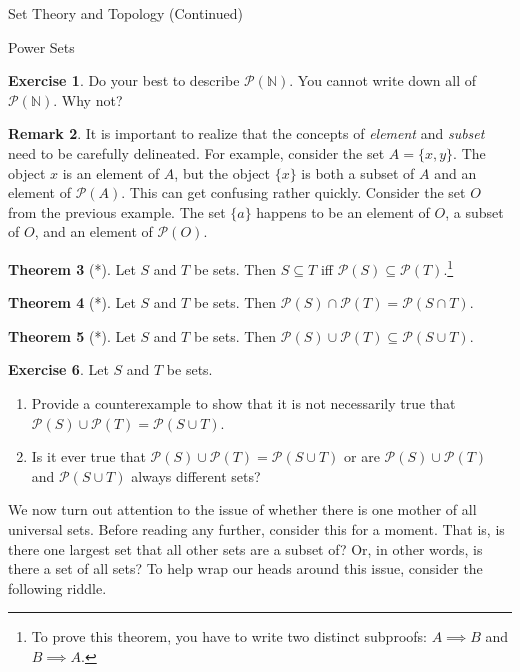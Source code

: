 \documentclass[11pt]{article}
\theoremstyle{definition}
\newtheorem{theorem}{Theorem}[section]
\newtheorem{exercise}[theorem]{Exercise}
\newtheorem{remark}[theorem]{Remark}
\begin{document}
\begin{section}{Set Theory and Topology (Continued)}
\begin{subsection}{Power Sets}
\begin{exercise}
Do your best to describe $\mathcal{P}(\mathbb{N})$.  You cannot write down all of $\mathcal{P}(\mathbb{N})$.  Why not?
\end{exercise}

\begin{remark}
It is important to realize that the concepts of \emph{element} and \emph{subset} need to be carefully delineated.  For example, consider the set $A=\{x,y\}$.  The object $x$ is an element of $A$, but the object $\{x\}$ is both a subset of $A$ and an element of $\mathcal{P}(A)$.  This can get confusing rather quickly.  Consider the set $O$ from the previous example.  The set $\{a\}$ happens to be an element of $O$, a subset of $O$, and an element of  $\mathcal{P}(O)$.
\end{remark}

\begin{theorem}[*]
Let $S$ and $T$ be sets.  Then $S\subseteq T$ iff $\mathcal{P}(S)\subseteq \mathcal{P}(T)$.\footnote{To prove this theorem, you have to write two distinct subproofs: $A\implies B$ and $B\implies A$.}
\end{theorem}

\begin{theorem}[*]
Let $S$ and $T$ be sets.  Then $\mathcal{P}(S)\cap\mathcal{P}(T)=\mathcal{P}(S\cap T)$.
\end{theorem}

\begin{theorem}[*]
Let $S$ and $T$ be sets.  Then $\mathcal{P}(S)\cup\mathcal{P}(T)\subseteq \mathcal{P}(S\cup T)$.
\end{theorem}


\begin{exercise}
Let $S$ and $T$ be sets.
\begin{enumerate}
\item Provide a counterexample to show that it is not necessarily true that $\mathcal{P}(S)\cup\mathcal{P}(T)= \mathcal{P}(S\cup T)$.
\item Is it ever true that $\mathcal{P}(S)\cup\mathcal{P}(T)= \mathcal{P}(S\cup T)$ or are $\mathcal{P}(S)\cup\mathcal{P}(T)$ and $\mathcal{P}(S\cup T)$ always different sets?
\end{enumerate}
\end{exercise}

We now turn out attention to the issue of whether there is one mother of all universal sets.  Before reading any further, consider this for a moment.  That is, is there one largest set that all other sets are a subset of?  Or, in other words, is there a set of all sets?  To help wrap our heads around this issue, consider the following riddle.


\end{subsection}
\end{section}
\end{document}
